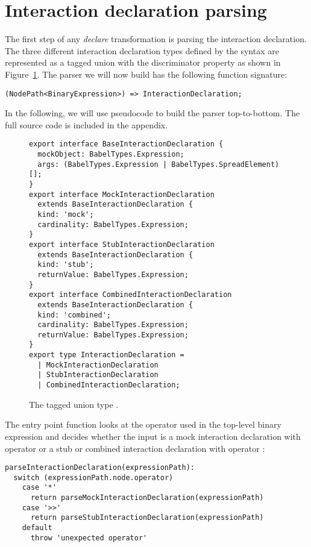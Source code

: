 \section{Interaction declaration parsing}
The first step of any \textit{declare} transformation
is parsing the interaction declaration.
The three different interaction declaration types defined by the syntax
are represented as a tagged union 
with the discriminator property 
as shown in Figure~\ref{fig:InteractionDeclarationType}.
The parser we will now build has the following function signature:
\begin{verbatim}
(NodePath<BinaryExpression>) => InteractionDeclaration;
\end{verbatim}
In the following, we will use pseudocode to build the parser top-to-bottom.
The full source code is included in the appendix.

\begin{figure}
  \begin{verbatim}
export interface BaseInteractionDeclaration {
  mockObject: BabelTypes.Expression;
  args: (BabelTypes.Expression | BabelTypes.SpreadElement)[];
}
export interface MockInteractionDeclaration
  extends BaseInteractionDeclaration {
  kind: 'mock';
  cardinality: BabelTypes.Expression;
}
export interface StubInteractionDeclaration
  extends BaseInteractionDeclaration {
  kind: 'stub';
  returnValue: BabelTypes.Expression;
}
export interface CombinedInteractionDeclaration
  extends BaseInteractionDeclaration {
  kind: 'combined';
  cardinality: BabelTypes.Expression;
  returnValue: BabelTypes.Expression;
}
export type InteractionDeclaration =
  | MockInteractionDeclaration
  | StubInteractionDeclaration
  | CombinedInteractionDeclaration;
  \end{verbatim}
  \caption{
    The tagged union type .
  }\label{fig:InteractionDeclarationType}
\end{figure}

The entry point function 
looks at the operator used in the top-level binary expression
and decides whether the input is
a mock interaction declaration with operator 
or a stub or combined interaction declaration with operator :
  \begin{verbatim}
parseInteractionDeclaration(expressionPath):
  switch (expressionPath.node.operator)
    case '*'
      return parseMockInteractionDeclaration(expressionPath)
    case '>>'
      return parseStubInteractionDeclaration(expressionPath)
    default
      throw 'unexpected operator'
\end{verbatim}

